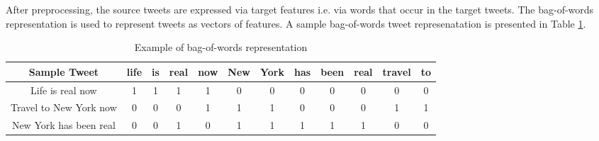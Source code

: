 After preprocessing, the source tweets are expressed via target features i.e. via words that occur in the target tweets. The bag-of-words ~\citep{tom} representation is used to represent tweets as vectors of features. A sample bag-of-words tweet represenatation is presented in Table \ref{sampletweets}.


\begin{table}[ht]
    \begin{center}
    \caption{Example of bag-of-words representation}
    \begin{tabular}[l]{|c|c|c|c|c|c|c|c|c|c|c|c|}
        \hline
        Sample Tweet & life & is & real & now & New & York & has & been & real & travel & to \\ 
        \hline
        Life is real now & 1 & 1 & 1 & 1 & 0 & 0 & 0 & 0 & 0 & 0 & 0 \\
        Travel to New York now & 0 & 0 & 0 & 1 & 1 & 1 & 0 & 0 & 0 & 1 & 1 \\
        New York has been real & 0 & 0 & 1 & 0 & 1 & 1 & 1 & 1 & 1 & 0 & 0 \\
        \hline
    \end{tabular}
    \label{sampletweets}
   \end{center}
\end{table}



